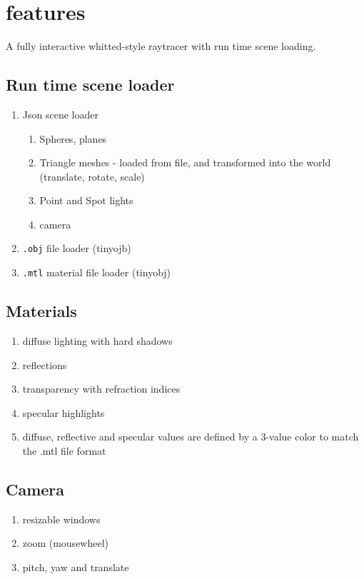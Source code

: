 \section{features}
A fully interactive whitted-style raytracer with run time scene loading.

\subsection{Run time scene loader}
    \begin{enumerate}
    \item Json scene loader
        \begin{enumerate}
        \item Spheres, planes
        \item Triangle meshes - loaded from file, and transformed into the world (translate, rotate, scale)
        \item Point and Spot lights
        \item camera
        \end{enumerate}
    \item \verb|.obj| file loader (tinyojb)
    \item \verb|.mtl| material file loader (tinyobj)
    \end{enumerate}

\subsection{Materials}
    \begin{enumerate}
    \item diffuse lighting with hard shadows
    \item reflections
    \item transparency with refraction indices
    \item specular highlights
    \item diffuse, reflective and specular values are defined by a 3-value color to match the .mtl file format
    \end{enumerate}

\subsection{Camera}
    \begin{enumerate}
    \item resizable windows
    \item zoom (mousewheel)
    \item pitch, yaw and translate
    \end{enumerate}

